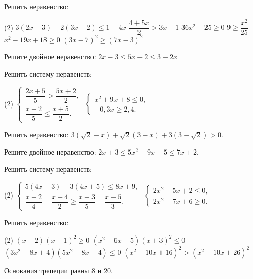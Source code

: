 \begin{class}[number=5]
	\begin{listofex}
		\item Решить неравенство:
		\begin{tasks}(2)
			\task \( 3(2x-3)-2(3x-2)\le1-4x \)
			\task \( \dfrac{4+5x}{2}>3x+1 \)
			\task \( 36x^2-25\ge0 \)
			\task \( 9\ge\dfrac{x^2}{25} \)
			\task \( x^2-19x+18\ge0 \)
			\task \( (3x-7)^2\ge(7x-3)^2 \)
		\end{tasks}
		\item Решите двойное неравенство: \( 2x-3\le5x-2\le3-2x \)
		\item Решить систему неравенств:
		\begin{tasks}(2)
			\task
			\( \left\{
			\begin{array}{l}
				\dfrac{2x+5}{5}>\dfrac{5x+2}{2},\\[0.5em]
				\dfrac{x+2}{5}\le\dfrac{x+5}{2}.
			\end{array}
			\right. \)
			\task
			\( \left\{
			\begin{array}{l}
				x^2+9x+8\le0,\\
				-0,3x\ge2,4.
			\end{array}
			\right. \)
		\end{tasks}
		\item Решить неравенство: \( 3(\sqrt{2}-x)+\sqrt{2}(3-x)+3(3-\sqrt{2})>0 \).
		\item Решите двойное неравенство: \( 2x+3\le5x^2-9x+5\le7x+2 \).
		\item Решить систему неравенств:
		\begin{tasks}(2)
			\task
			\( \left\{
			\begin{array}{l}
				5(4x+3)-3(4x+5)\le8x+9,\\
				\dfrac{x+2}{4}+\dfrac{x+4}{2}\ge\dfrac{x+3}{5}+\dfrac{x+5}{3}.
			\end{array}
			\right. \)
			\task
			\( \left\{
			\begin{array}{l}
				2x^2-5x+2\le0,\\
				2x^2-7x+6\ge0.
			\end{array}
			\right. \)
		\end{tasks}
		\item Решить неравенство:
		\begin{tasks}(2)
			\task \( (x-2)(x-1)^2\ge0 \)
			\task \( (x^2-6x+5)(x+3)^2\le0 \)
			\task \( (3x^2-8x+4)(5x^2-8x-4)\le0 \)
			\task \( (x^2+10x+16)^2>(x^2+10x+26)^2 \)
		\end{tasks}
		\item Основания трапеции равны \( 8 \) и \( 20 \).
		

\end{listofex}
\end{class}
